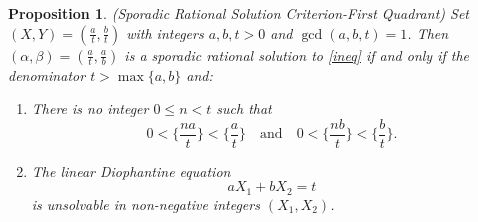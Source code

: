 \documentclass[12pt,letterpaper, reqno]{amsart}
\newtheorem{prop}[thm]{Proposition}
\theoremstyle{definition}
\theoremstyle{remark}
\begin{document}
\begin{prop} \label{prop:414aa}
{ \rm (Sporadic Rational Solution Criterion-First Quadrant)}
Set   $(X, Y)= (\frac{a}{t}, \frac{b}{t})$ with integers $a,b, t >0$ and $\gcd(a, b, t)=1$.
Then $(\alpha, \beta)=(\frac{a}{t}, \frac{a}{b})$ is a sporadic rational solution to \eqref{ineq}  if and only if 
the denominator $t > \max\{a, b\}$ and:
\begin{enumerate}
\item[(i)]
There is no integer $0 \le n < t$ such that
$$
0 < \{ \frac{na}{t}\} <  \{ \frac{a}{t}\} \quad \mbox{and} \quad  0 < \{ \frac{nb}{t}\} <  \{ \frac{b}{t}\}.
$$

\item[(ii)]
The linear
Diophantine equation 
\begin{equation}\label{eq:Frob2}
a X_1 + bX_2= t
\end{equation}
is unsolvable in non-negative integers $(X_1,X_2)$. 
\end{enumerate}
\end{prop}
\end{document}
